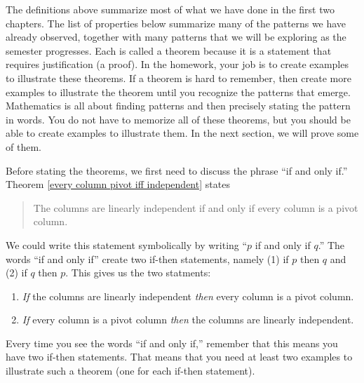 The definitions above summarize most of what we have done in the first two chapters. The list of properties below summarize many of the patterns we have already observed, together with many patterns that we will be exploring as the semester progresses.  Each is called a theorem because it is a statement that requires justification (a proof). In the homework, your job is to create examples to illustrate these theorems.  If a theorem is hard to remember, then create more examples to illustrate the theorem until you recognize the patterns that emerge.  Mathematics is all about finding patterns and then precisely stating the pattern in words. You do not have to memorize all of these theorems, but you should be able to create examples to illustrate them. In the next section, we will prove some of them.

Before stating the theorems, we first need to discuss the phrase ``if and only if.'' Theorem \ref{every column pivot iff independent} states 
\begin{quote}
The columns are linearly independent if and only if every column is a pivot column.
\end{quote}
We could write this statement symbolically by writing ``$p$ if and only if $q$.''
The words ``if and only if'' create two if-then statements, namely (1) if $p$ then $q$ and (2) if $q$ then $p$. This gives us the two statments:
\begin{enumerate}
	\item \emph{If} the columns are linearly independent \emph{then} every column is a pivot column.
	\item \emph{If} every column is a pivot column \emph{then} the columns are linearly independent.
\end{enumerate}
Every time you see the words ``if and only if,'' remember that this means you have two if-then statements.  That means that you need at least two examples to illustrate such a theorem (one for each if-then statement).



